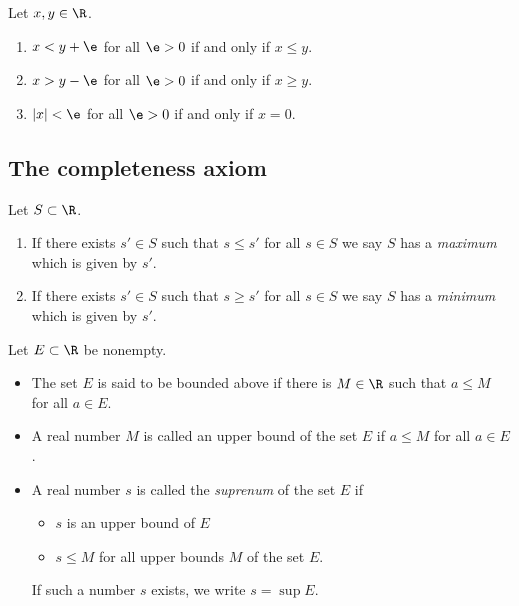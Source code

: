 \documentclass{article}
\begin{document}
\begin{theorem}
    Let $x,y\in\R$.
    \begin{enumerate}
        \item $x<y+\e$ for all $\e>0$ if and only if $x\leq y$.
        \item $x>y-\e$ for all $\e>0$ if and only if $x\geq y$.
        \item $|x|<\e$ for all $\e>0$ if and only if $x=0$.
    \end{enumerate}
\end{theorem}

\subsection{The completeness axiom}

\begin{definition}
    Let $S\subset\R$.
    \begin{enumerate}
        \item If there exists $s'\in S$ such that $s\leq s'$ for all $s\in S$ we say $S$ has a
              \emph{maximum} which is given by $s'$.
        \item If there exists $s'\in S$ such that $s\geq s'$ for all $s\in S$ we say $S$ has a
              \emph{minimum} which is given by $s'$.
    \end{enumerate}
\end{definition}

\begin{definition}
    Let $E\subset\R$ be nonempty.
    \begin{itemize}
        \item The set $E$ is said to be bounded above if there is $M\in\R$ such that $a\leq M$ for all $a\in E$.
        \item A real number $M$ is called an upper bound of the set $E$ if $a\leq M$ for all $a\in E$.
        \item A real number $s$ is called the \emph{suprenum} of the set $E$ if \begin{itemize}
                  \item $s$ is an upper bound of $E$
                  \item $s\leq M$ for all upper bounds $M$ of the set $E$.
              \end{itemize}
              If such a number $s$ exists, we write $s=\sup E$.
    \end{itemize}
\end{definition}
\end{document}
